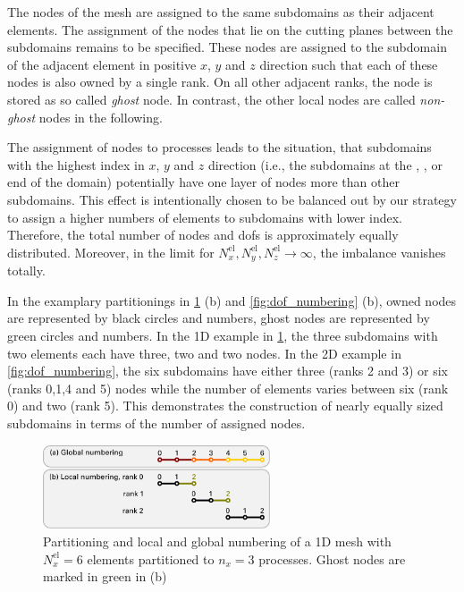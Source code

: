 The nodes of the mesh are assigned to the same subdomains as their adjacent elements. 
The assignment of the nodes that lie on the cutting planes between the subdomains remains to be specified. These nodes are assigned to the subdomain of the adjacent element in positive $x$, $y$ and $z$ direction such that each of these nodes is also owned by a single rank. On all other adjacent ranks, the node is stored as so called \emph{ghost} node. In contrast, the other local nodes are called \emph{non-ghost} nodes in the following.

The assignment of nodes to processes leads to the situation, that subdomains with the highest index in $x$, $y$ and $z$ direction (i.e., the subdomains at the , , or  end of the domain) potentially have one layer of nodes more than other subdomains. This effect is
intentionally chosen to be balanced out by our strategy to assign a higher numbers of elements to 
subdomains with lower index. Therefore, the total number of nodes and dofs is  approximately equally distributed. Moreover, in the limit for $N^\text{el}_x,N^\text{el}_y,N^\text{el}_z \to \infty$, the imbalance vanishes totally. 

In the examplary partitionings in \cref{fig:1d_nodes} (b) and \cref{fig:dof_numbering} (b), owned nodes are represented by black circles and numbers, ghost nodes are represented by green circles and numbers. In the 1D example in \cref{fig:1d_nodes}, the three subdomains with two elements each have three, two and two nodes. In the 2D example in \cref{fig:dof_numbering}, the six subdomains have either three (ranks 2 and 3) or six (ranks 0,1,4 and 5) nodes while the number of elements varies between six (rank 0) and two (rank 5). This demonstrates the construction of nearly equally sized subdomains in terms of the number of assigned nodes.

\begin{figure}%
  \centering%
  \includegraphics[width=0.6\textwidth]{images/implementation/1d_nodes.pdf}%
  \caption{Partitioning and local and global numbering of a 1D mesh with $N^\text{el}_x=6$ elements partitioned to $n_x=3$ processes. Ghost nodes are marked in green in (b)}%
  \label{fig:1d_nodes}%
\end{figure}%

